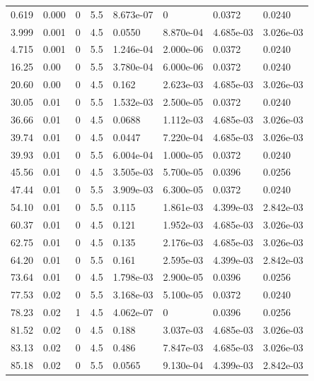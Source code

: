 \documentclass[preview]{standalone}
\begin{document}
{{\begin{tabular}{L{1.2cm}C{1.2cm} C{0.3cm}C{0.5cm} C{1.4cm}C{1.4cm} C{1.4cm}C{1.4cm}}
  0.619  &  0.000  & 0     & 5.5 &  8.673e-07  & 0  & 0.0372 &  0.0240   \\ 
  3.999  &  0.001  & 0     & 4.5 &  0.0550  & 8.870e-04  & 4.685e-03 &  3.026e-03   \\ 
  4.715  &  0.001  & 0     & 5.5 &  1.246e-04  & 2.000e-06  & 0.0372 &  0.0240   \\ 
  16.25  &  0.00  & 0     & 5.5 &  3.780e-04  & 6.000e-06  & 0.0372 &  0.0240   \\ 
  20.60  &  0.00  & 0     & 4.5 &  0.162  & 2.623e-03  & 4.685e-03 &  3.026e-03   \\ 
  30.05  &  0.01  & 0     & 5.5 &  1.532e-03  & 2.500e-05  & 0.0372 &  0.0240   \\ 
  36.66  &  0.01  & 0     & 4.5 &  0.0688  & 1.112e-03  & 4.685e-03 &  3.026e-03   \\ 
  39.74  &  0.01  & 0     & 4.5 &  0.0447  & 7.220e-04  & 4.685e-03 &  3.026e-03   \\ 
  39.93  &  0.01  & 0     & 5.5 &  6.004e-04  & 1.000e-05  & 0.0372 &  0.0240   \\ 
  45.56  &  0.01  & 0     & 4.5 &  3.505e-03  & 5.700e-05  & 0.0396 &  0.0256   \\ 
  47.44  &  0.01  & 0     & 5.5 &  3.909e-03  & 6.300e-05  & 0.0372 &  0.0240   \\ 
  54.10  &  0.01  & 0     & 5.5 &  0.115  & 1.861e-03  & 4.399e-03 &  2.842e-03   \\ 
  60.37  &  0.01  & 0     & 4.5 &  0.121  & 1.952e-03  & 4.685e-03 &  3.026e-03   \\ 
  62.75  &  0.01  & 0     & 4.5 &  0.135  & 2.176e-03  & 4.685e-03 &  3.026e-03   \\ 
  64.20  &  0.01  & 0     & 5.5 &  0.161  & 2.595e-03  & 4.399e-03 &  2.842e-03   \\ 
  73.64  &  0.01  & 0     & 4.5 &  1.798e-03  & 2.900e-05  & 0.0396 &  0.0256   \\ 
  77.53  &  0.02  & 0     & 5.5 &  3.168e-03  & 5.100e-05  & 0.0372 &  0.0240   \\ 
  78.23  &  0.02  & 1     & 4.5 &  4.062e-07  & 0  & 0.0396 &  0.0256   \\ 
  81.52  &  0.02  & 0     & 4.5 &  0.188  & 3.037e-03  & 4.685e-03 &  3.026e-03   \\ 
  83.13  &  0.02  & 0     & 4.5 &  0.486  & 7.847e-03  & 4.685e-03 &  3.026e-03   \\ 
  85.18  &  0.02  & 0     & 5.5 &  0.0565  & 9.130e-04  & 4.399e-03 &  2.842e-03   \\ 

\end{tabular}}}
\end{document}
